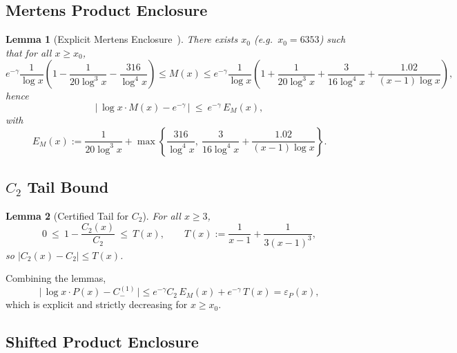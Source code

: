\documentclass[11pt]{article}
\theoremstyle{inline}
\theoremstyle{break}
\newtheorem{lemma}{Lemma}
\theoremstyle{break}
\theoremstyle{break}
\theoremstyle{break}
\theoremstyle{break}
\theoremstyle{break}
\theoremstyle{break}
\theoremstyle{inline}
\newcommand{\xMertens}{6353} %
\begin{document}
\subsection{Mertens Product Enclosure}\label{app:mertens}

\begin{lemma}[Explicit Mertens Enclosure~\cite{RosserSchoenfeld1962, Dusart2010}]\label{lem:explicit-mertens}
There exists \( x_0 \) (e.g.\ \( x_0=\xMertens \)) such that for all \( x\ge x_0 \),
\begin{equation}
e^{-\gamma}\frac{1}{\log x}\!\left(1-\frac{1}{20\log^3 x}-\frac{316}{\log^4 x}\right)
\le M(x) \le
e^{-\gamma}\frac{1}{\log x}\!\left(1+\frac{1}{20\log^3 x}+\frac{3}{16\log^4 x}
+\frac{1.02}{(x-1)\log x}\right),
\end{equation}
hence
\begin{equation}
\bigl|\,\log x\cdot M(x)-e^{-\gamma}\,\bigr|\ \le\ e^{-\gamma}\,E_M(x),
\end{equation}
with
\begin{equation}
E_M(x) := \frac{1}{20\log^3 x}+\max\!\left\{\frac{316}{\log^4 x},\ \frac{3}{16\log^4 x}+\frac{1.02}{(x-1)\log x}\right\}.
\end{equation}
\end{lemma}

\subsection{\(C_2\) Tail Bound}\label{app:C2-tail}
\begin{lemma}[Certified Tail for \( C_2 \)]\label{lem:C2-tail}
For all \( x\ge 3 \),
\begin{equation}
0\ \le\ 1-\frac{C_2(x)}{C_2}\ \le\ T(x),
\qquad
T(x) := \frac{1}{x-1}+\frac{1}{3(x-1)^3},
\end{equation}
so \( |C_2(x)-C_2|\le T(x) \).
\end{lemma}

Combining the lemmas,
\begin{equation}
\bigl|\,\log x\cdot P(x) - C_-^{(1)}\,\bigr|
\le e^{-\gamma}C_2\,E_M(x) + e^{-\gamma}\,T(x) = \varepsilon_P(x),
\end{equation}
which is explicit and strictly decreasing for \( x\ge x_0 \).


\subsection{Shifted Product Enclosure}\label{app:shifted-product}
\end{document}

